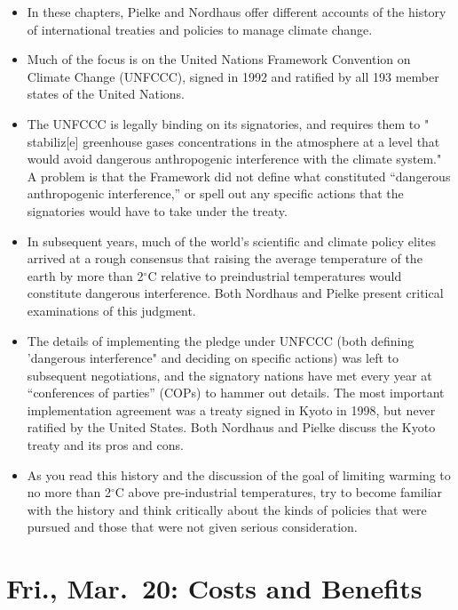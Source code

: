 \documentclass[
]{article}
\providecommand{\tightlist}{%
  \setlength{\itemsep}{0pt}\setlength{\parskip}{0pt}}
\newcommand{\degC}{\ensuremath{^\circ \mathrm{C}}}
\begin{document}
\begin{itemize}
\tightlist
\item
  In these chapters, Pielke and Nordhaus offer different accounts of the
  history of international treaties and policies to manage climate
  change.
\item
  Much of the focus is on the United Nations Framework Convention on
  Climate Change (UNFCCC), signed in 1992 and ratified by all 193 member
  states of the United Nations.
\item
  The UNFCCC is legally binding on its signatories, and requires them to
  " stabiliz{[}e{]} greenhouse gases concentrations in the atmosphere at
  a level that would avoid dangerous anthropogenic interference with the
  climate system." A problem is that the Framework did not define what
  constituted ``dangerous anthropogenic interference,'' or spell out any
  specific actions that the signatories would have to take under the
  treaty.
\item
  In subsequent years, much of the world's scientific and climate policy
  elites arrived at a rough consensus that raising the average
  temperature of the earth by more than 2\degC{} relative to
  preindustrial temperatures would constitute dangerous interference.
  Both Nordhaus and Pielke present critical examinations of this
  judgment.
\item
  The details of implementing the pledge under UNFCCC (both defining
  'dangerous interference" and deciding on specific actions) was left to
  subsequent negotiations, and the signatory nations have met every year
  at ``conferences of parties'' (COPs) to hammer out details. The most
  important implementation agreement was a treaty signed in Kyoto in
  1998, but never ratified by the United States. Both Nordhaus and
  Pielke discuss the Kyoto treaty and its pros and cons.
\item
  As you read this history and the discussion of the goal of limiting
  warming to no more than 2\degC{} above pre-industrial temperatures,
  try to become familiar with the history and think critically about the
  kinds of policies that were pursued and those that were not given
  serious consideration.
\end{itemize}

\hypertarget{fri.-mar.-20-costs-and-benefits}{%
\section{Fri., Mar.~20: Costs and
Benefits}\label{fri.-mar.-20-costs-and-benefits}}
\end{document}
